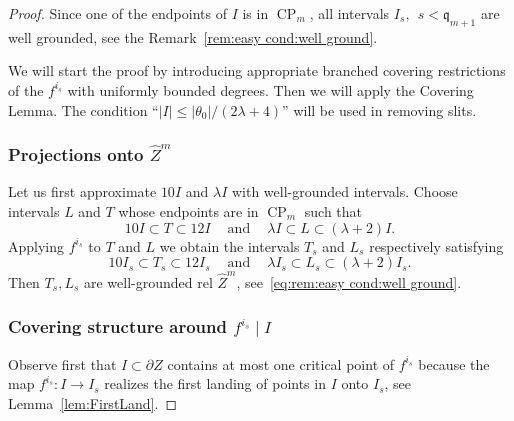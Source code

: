 \documentclass{amsart}
\renewcommand{\sp}{{\ \ }}
\newcommand{\1}{{\mathbb 1 }}
\newcommand{\wZ}{{\widehat Z}}
\newcommand{\qq}{\mathfrak{q}}
\theoremstyle{remark}
\numberwithin{equation}{section}
\theoremstyle{definition}
\newcommand{\CP}{{\operatorname{CP}}}
\begin{document}
\begin{proof}

Since one of the endpoints of $I$ is in $\CP_m$, all intervals $I_s,\sp s <\qq_{m+1}$ are well grounded, see the Remark~\ref{rem:easy cond:well ground}. 

We will start the proof by introducing appropriate branched covering restrictions of the $f^{i_s}$ with uniformly bounded degrees. Then we will apply the Covering Lemma. The condition  ``$ |I|\le |\theta_0|/(2\lambda+4)$'' will be used in removing slits. 

 


\subsubsection{Projections onto $\wZ^m$} Let us first approximate $10 I$ and $\lambda I$ with well-grounded intervals. Choose intervals $L$ and $T$ whose endpoints are in $\CP_m$
such that
\[ 10 I \subset T \subset 12 I \sp\sp \text{ and }\sp\sp  \lambda I \subset L\subset (\lambda +2)I .\]
Applying $f^{i_s}$ to $T$ and $L$ we obtain the intervals $T_s$ and $L_s$ respectively satisfying 
\[ 10 I_s \subset T_s \subset 12 I_s \sp\sp \text{ and }\sp\sp  \lambda I_s \subset L_s\subset (\lambda +2)I_s .\] 
Then $T_s, L_s$ are well-grounded rel $\wZ^m$, see~\eqref{eq:rem:easy cond:well ground}.  





\subsubsection{Covering structure around $f^{i_s}\mid I$} 
\label{sss:CovStrZ}
 Observe first that $I\subset \partial Z$ contains at most one critical point of $f^{i_s}$ because the map $f^{i_s}\colon I\to I_s$ realizes the first landing of points in $I$ onto $I_s$, see Lemma~\ref{lem:FirstLand}.


\end{proof}
\end{document}
